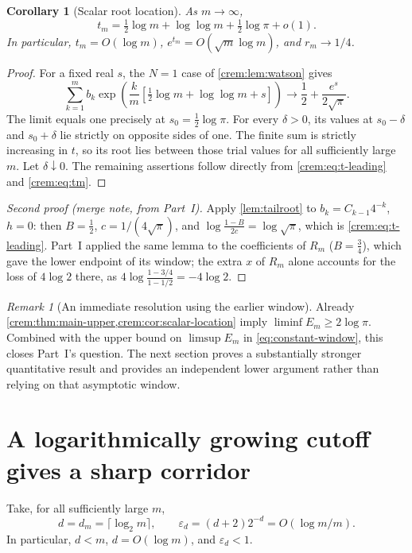 \documentclass[11pt,a4paper]{article}
\newtheorem{corollary}[corollary]{Corollary}
\theoremstyle{definition}\newaliascnt{definition}{theorem}
\theoremstyle{remark}\newaliascnt{remark}{theorem}
\newtheorem{remark}[remark]{Remark}
\newcommand{\eps}{\varepsilon}
\begin{document}
\begin{corollary}[Scalar root location]\label{crem:cor:scalar-location}
As $m\to\infty$,
\begin{equation}
 t_m=\tfrac12\log m+\log\log m+\tfrac12\log\pi+o(1).
 \label{crem:eq:t-leading}
\end{equation}
In particular, $t_m=O(\log m)$, $e^{t_m}=O(\sqrt m\log m)$, and
$r_m\to1/4$.
\end{corollary}
\begin{proof}
For a fixed real $s$, the $N=1$ case of \cref{crem:lem:watson} gives
\[
 \sum_{k=1}^m b_k
 \exp\!\left(\frac{k}{m}
 [\tfrac12\log m+\log\log m+s]\right)
 \longrightarrow \frac12+\frac{e^s}{2\sqrt\pi}.
\]
The limit equals one precisely at $s_0=\tfrac12\log\pi$. For every
$\delta>0$, its values at $s_0-\delta$ and $s_0+\delta$ lie strictly on
opposite sides of one. The finite sum is strictly increasing in $t$, so its
root lies between those trial values for all sufficiently large $m$. Let
$\delta\downarrow0$. The remaining assertions follow directly from
\eqref{crem:eq:t-leading} and \eqref{crem:eq:tm}.
\end{proof}

\begin{proof}[Second proof (merge note, from Part~I)]
Apply \cref{lem:tailroot} to $b_k=C_{k-1}4^{-k}$, $h=0$: then $B=\frac12$,
$c=1/(4\sqrt\pi)$, and $\log\frac{1-B}{2c}=\log\sqrt\pi$, which is
\eqref{crem:eq:t-leading}. Part~I applied the same lemma to the coefficients
of $R_m$ ($B=\frac34$), which gave the lower endpoint of its window; the
extra $x$ of $R_m$ alone accounts for the loss of $4\log2$ there, as
$4\log\frac{1-3/4}{1-1/2}=-4\log2$.
\end{proof}

\begin{remark}[An immediate resolution using the earlier window]
\label{crem:rem:immediate}
Already \cref{crem:thm:main-upper,crem:cor:scalar-location} imply
$\liminf E_m\ge2\log\pi$. Combined with the upper bound on $\limsup E_m$ in
\eqref{eq:constant-window}, this closes Part~I's question. The next section
proves a substantially stronger quantitative result and provides an
independent lower argument rather than relying on that asymptotic window.
\end{remark}

\section{A logarithmically growing cutoff gives a sharp corridor}
\label{crem:sec:quantitative}
Take, for all sufficiently large $m$,
\begin{equation}
 d=d_m=\lceil\log_2m\rceil,
 \qquad \eps_d=(d+2)2^{-d}=O(\log m/m).
 \label{crem:eq:choice-d}
\end{equation}
In particular, $d<m$, $d=O(\log m)$, and $\eps_d<1$.
\end{document}

